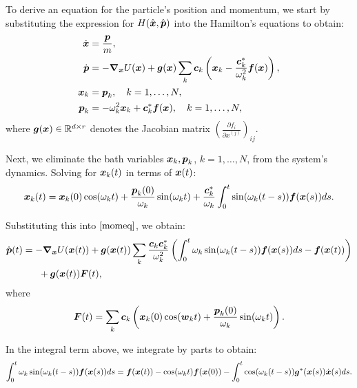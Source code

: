 To derive an equation for the particle's position and momentum, we start by substituting the expression for $H(\hat{\boldsymbol{\boldsymbol{x}}}, \hat{\boldsymbol{\boldsymbol{p}}})$ into the Hamilton's equations to obtain: 
\begin{align}
\dot{\boldsymbol{x}} &= \frac{\boldsymbol{p}}{m}, \\ 
\dot{\boldsymbol{p}} &= -\boldsymbol{\nabla}_{\boldsymbol{x}} U(\boldsymbol{x})  + \boldsymbol{g}(\boldsymbol{x}) \sum_{k} \boldsymbol{c}_{k} \left(\boldsymbol{x}_{k}-\frac{\boldsymbol{c}^*_{k}}{ \omega_{k}^2} \boldsymbol{f}(\boldsymbol{x}) \right), \label{momeq}\\
\boldsymbol{x}_{k} &= \boldsymbol{p}_{k}, \ \ \ k = 1, \dots, N,\\
\boldsymbol{p}_{k} &= -\omega_{k}^2 \boldsymbol{x}_{k} + \boldsymbol{c}^*_{k} \boldsymbol{f}(\boldsymbol{x}), \ \ \ k = 1,\dots,N,
\end{align}
where $\boldsymbol{g}(\boldsymbol{x}) \in \mathbb{R}^{d \times r}$ denotes the Jacobian matrix $\left(\frac{\partial f_{i}}{\partial x^{(j)}} \right)_{ij}.$

Next, we eliminate the bath variables $\boldsymbol{x}_{k}, \boldsymbol{p}_{k}$, $k=1,\dots,N$, from the system's dynamics. Solving for $\boldsymbol{x}_{k}(t)$ in terms of $\boldsymbol{x}(t)$:
\begin{equation}\boldsymbol{x}_{k}(t) = \boldsymbol{x}_{k}(0)\cos(\omega_{k}t) + \frac{\boldsymbol{p}_{k}(0)}{\omega_{k}} \sin(\omega_{k}t) + \frac{\boldsymbol{c}^*_{k}}{ \omega_{k}} \int_{0}^{t} \sin(\omega_{k}(t-s)) \boldsymbol{f}(\boldsymbol{x}(s)) ds. \end{equation}

Substituting this into $\eqref{momeq}$, we obtain:
\begin{align}
\dot{\boldsymbol{p}}(t) &= -\boldsymbol{\nabla}_{\boldsymbol{x}} U(\boldsymbol{x}(t))  + \boldsymbol{g}(\boldsymbol{x}(t)) \sum_{k} \frac{\boldsymbol{c}_{k} \boldsymbol{c}_{k}^{*}}{ \omega_{k}^2} \left( \int_{0}^{t}  \omega_{k} \sin(\omega_{k}(t-s)) \boldsymbol{f}(\boldsymbol{x}(s)) ds  - \boldsymbol{f}(\boldsymbol{x}(t)) \right) \nonumber \\ 
&\ \ \ \  \ + \boldsymbol{g}(\boldsymbol{x}(t)) \boldsymbol{F}(t), \end{align}
where \begin{equation}\boldsymbol{F}(t) = \sum_{k} \boldsymbol{c}_{k} \left(\boldsymbol{x}_{k}(0) \cos(\boldsymbol{w}_{k}t) + \frac{\boldsymbol{p}_{k}(0)}{ \omega_{k}} \sin(\omega_{k}t) \right).\end{equation}

In the integral term above, we integrate by parts to obtain:
\begin{equation} \int_{0}^{t}  \omega_{k} \sin(\omega_{k}(t-s)) \boldsymbol{f}(\boldsymbol{x}(s)) ds = \boldsymbol{f}(\boldsymbol{x}(t)) - \cos(\omega_{k}t) \boldsymbol{f}(\boldsymbol{x}(0)) - \int_{0}^{t} \cos(\omega_{k}(t-s)) \boldsymbol{g}^*(\boldsymbol{x}(s)) \dot{\boldsymbol{x}}(s) ds.\end{equation}

